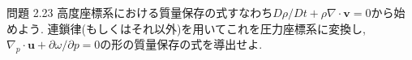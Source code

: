 \documentclass[a4j,12pt,openbib,oneside,dvipdfmx]{jarticle}
\def\theequation{\arabic{chapter}.\arabic{equation}}
\def\thepage{\arabic{page}}
\begin{document}
\def\theequation{\arabic{equation}}
\setcounter{equation}{0}
\renewcommand{\thepage}{223-\arabic{page}}
\setcounter{page}{1}

\begin{itembox}[l]{問題 2.23}
高度座標系における質量保存の式すなわち$D\rho/Dt+\rho\nabla\cdot\bm{v}=0$から始めよう. 連鎖律(もしくはそれ以外)を用いてこれを圧力座標系に変換し, $\nabla_p\cdot\bm{u}+\partial{\omega}/\partial{p}=0$の形の質量保存の式を導出せよ.
\end{itembox}
\\
\\
\par
\end{document}
